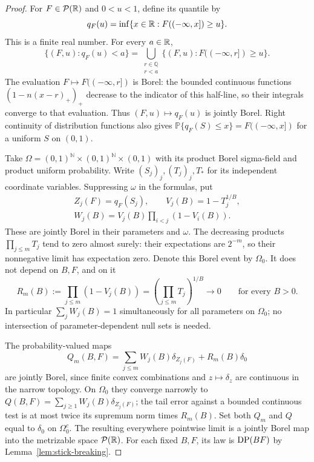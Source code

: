 \begin{proof}
For \(F\in\mathcal P(\mathbb R)\) and \(0<u<1\), define its quantile by
\[
 q_F(u)=\inf\{x\in\mathbb R:F((-\infty,x])\ge u\}.
\]
This is a finite real number.
For every \(a\in\mathbb R\),
\begin{equation}\label{eq:quantile-joint-borel}
 \{(F,u):q_F(u)<a\}
 =\bigcup_{\substack{r\in\mathbb Q\\r<a}}
       \{(F,u):F((-\infty,r])\ge u\}.
\end{equation}
The evaluation \(F\mapsto F((-\infty,r])\) is Borel: the bounded continuous functions \((1-n(x-r)_+)_+\) decrease to the indicator of this half-line, so their integrals converge to that evaluation.
Thus \((F,u)\mapsto q_F(u)\) is jointly Borel.
Right continuity of distribution functions also gives \(\mathbb P\{q_F(S)\le x\}=F((-\infty,x])\) for a uniform \(S\) on \((0,1)\).

Take \(\Omega=(0,1)^{\mathbb N}\times(0,1)^{\mathbb N}\times(0,1)\) with its product Borel sigma-field and product uniform probability.
Write \((S_j)_j,(T_j)_j,T_*\) for its independent coordinate variables.
Suppressing \(\omega\) in the formulas, put
\begin{equation}\label{eq:parameterized-stick-breaking}
 \begin{gathered}
 Z_j(F)=q_F(S_j),\qquad V_j(B)=1-T_j^{1/B},\\
 W_j(B)=V_j(B)\prod_{i<j}(1-V_i(B)).
 \end{gathered}
\end{equation}
These are jointly Borel in their parameters and \(\omega\).
The decreasing products \(\prod_{j\le m}T_j\) tend to zero almost surely: their expectations are \(2^{-m}\), so their nonnegative limit has expectation zero.
Denote this Borel event by \(\Omega_0\).
It does not depend on \(B,F\), and on it
\[
 R_m(B):=\prod_{j\le m}(1-V_j(B))
        =\left(\prod_{j\le m}T_j\right)^{1/B}
        \longrightarrow0\qquad\text{for every }B>0.
\]
In particular \(\sum_jW_j(B)=1\) simultaneously for all parameters on \(\Omega_0\); no intersection of parameter-dependent null sets is needed.

The probability-valued maps
\[
 Q_m(B,F)=\sum_{j\le m}W_j(B)\delta_{Z_j(F)}+R_m(B)\delta_0
\]
are jointly Borel, since finite convex combinations and \(z\mapsto\delta_z\) are continuous in the narrow topology.
On \(\Omega_0\) they converge narrowly to \(Q(B,F)=\sum_{j\ge1}W_j(B)\delta_{Z_j(F)}\); the tail error against a bounded continuous test is at most twice its supremum norm times \(R_m(B)\).
Set both \(Q_m\) and \(Q\) equal to \(\delta_0\) on \(\Omega_0^c\).
The resulting everywhere pointwise limit is a jointly Borel map into the metrizable space \(\mathcal P(\mathbb R)\).
For each fixed \(B,F\), its law is \(\operatorname{DP}(BF)\) by Lemma~\ref{lem:stick-breaking}.


\end{proof}
